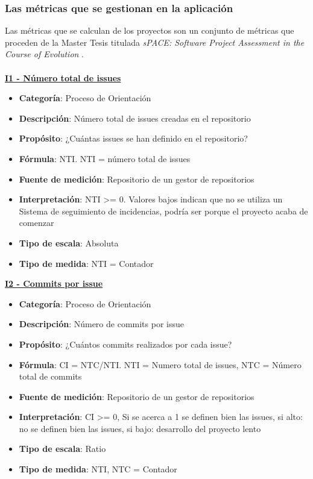 \subsubsection{Las métricas que se gestionan en la aplicación}
Las métricas que se calculan de los proyectos son un conjunto de métricas que proceden de la Master Tesis titulada \textit{sPACE: Software Project Assessment in the Course of Evolution} \cite{ratzinger_space:_2007}.\\\\
\textbf{\underline{I1 - Número total de issues}}
\begin{itemize}
	\tightlist
	\item \textbf{Categoría}: Proceso de Orientación
	\item \textbf{Descripción}: Número total de issues creadas en el repositorio
	\item \textbf{Propósito}: ¿Cuántas issues se han definido en el repositorio?
	\item \textbf{Fórmula}: NTI. NTI = número total de issues
	\item \textbf{Fuente de medición}: Repositorio de un gestor de repositorios
	\item \textbf{Interpretación}: NTI >= 0. Valores bajos indican que no se utiliza un Sistema de seguimiento de incidencias, podría ser porque el proyecto acaba de comenzar
	\item \textbf{Tipo de escala}: Absoluta
	\item \textbf{Tipo de medida}: NTI = Contador
\end{itemize}
\textbf{\underline{I2 - Commits por issue}}
\begin{itemize}
	\tightlist
	\item \textbf{Categoría}: Proceso de Orientación
	\item \textbf{Descripción}: Número de commits por issue
	\item \textbf{Propósito}: ¿Cuántos commits realizados por cada issue?
	\item \textbf{Fórmula}: CI = NTC/NTI. NTI = Numero total de issues, NTC = Número total de commits
	\item \textbf{Fuente de medición}: Repositorio de un gestor de repositorios
	\item \textbf{Interpretación}: CI >= 0, Si se acerca a 1 se definen bien las issues, si alto: no se definen bien las issues, si bajo: desarrollo del proyecto lento
	\item \textbf{Tipo de escala}: Ratio 
	\item \textbf{Tipo de medida}: NTI, NTC = Contador
\end{itemize}

